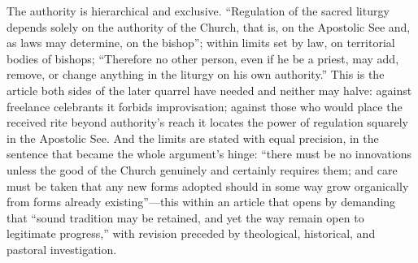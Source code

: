 The authority is hierarchical and exclusive. ``Regulation of the sacred liturgy depends solely on the authority of the Church, that is, on the Apostolic See and, as laws may determine, on the bishop''; within limits set by law, on territorial bodies of bishops; ``Therefore no other person, even if he be a priest, may add, remove, or change anything in the liturgy on his own authority.'' This is the article both sides of the later quarrel have needed and neither may halve: against freelance celebrants it forbids improvisation; against those who would place the received rite beyond authority's reach it locates the power of regulation squarely in the Apostolic See. And the limits are stated with equal precision, in the sentence that became the whole argument's hinge: ``there must be no innovations unless the good of the Church genuinely and certainly requires them; and care must be taken that any new forms adopted should in some way grow organically from forms already existing''---this within an article that opens by demanding that ``sound tradition may be retained, and yet the way remain open to legitimate progress,'' with revision preceded by theological, historical, and pastoral investigation.

